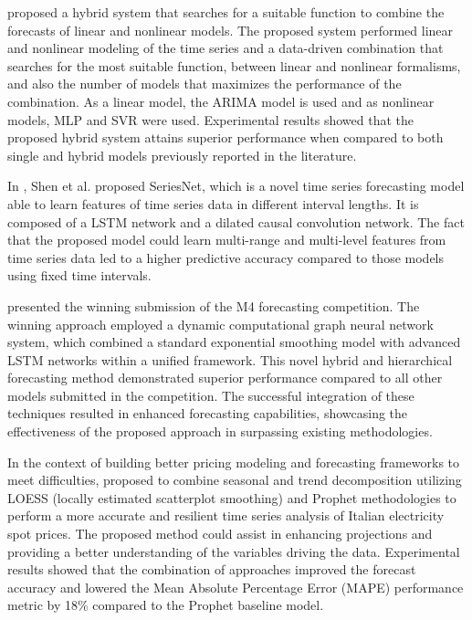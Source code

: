 \cite{DEOSANTOSJUNIOR201972} proposed a hybrid system that searches for a suitable function to combine the forecasts of linear and nonlinear models.
The proposed system performed linear and nonlinear modeling of the time series and a data-driven combination that searches for the most suitable function, between linear and nonlinear formalisms, and also the number of models that maximizes the performance of the combination.
As a linear model, the ARIMA model is used and as nonlinear models, MLP and SVR were used.
Experimental results showed that the proposed hybrid system attains superior performance when compared to both single and hybrid models previously reported in the literature.

In \cite{SHEN2020302}, Shen et al. proposed SeriesNet, which is a novel time series forecasting model able to learn features of time series data in different interval lengths.
It is composed of a LSTM network and a dilated causal convolution network.
The fact that the proposed model could learn multi-range and multi-level features from time series data led to a higher predictive accuracy compared to those models using fixed time intervals.

\cite{SMYL202075} presented the winning submission of the M4 forecasting competition.
The winning approach employed a dynamic computational graph neural network system, which combined a standard exponential smoothing model with advanced LSTM networks within a unified framework.
This novel hybrid and hierarchical forecasting method demonstrated superior performance compared to all other models submitted in the competition.
The successful integration of these techniques resulted in enhanced forecasting capabilities, showcasing the effectiveness of the proposed approach in surpassing existing methodologies.

In the context of building better pricing modeling and forecasting frameworks to meet difficulties, \cite{en16031371} proposed to combine seasonal and trend decomposition utilizing LOESS (locally estimated scatterplot smoothing) and Prophet methodologies to perform a more accurate and resilient time series analysis of Italian electricity spot prices.
The proposed method could assist in enhancing projections and providing a better understanding of the variables driving the data.
Experimental results showed that the combination of approaches improved the forecast accuracy and lowered the Mean Absolute Percentage Error (MAPE) performance metric by 18\% compared to the Prophet baseline model.


